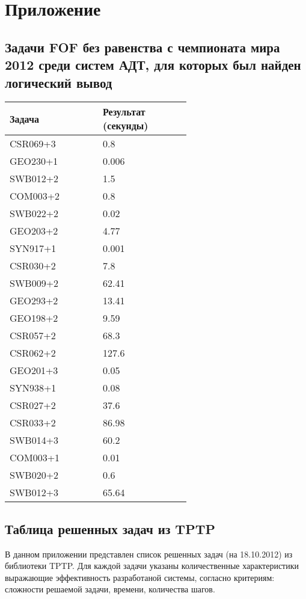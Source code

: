\chapter*{Приложение}




\section*{Задачи FOF без равенства с чемпионата мира 2012 среди систем АДТ, для которых был найден логический вывод}

\begin{longtable}[H]{|p{0.3\linewidth}|p{0.3\linewidth}|}
\hline
\textbf{Задача} & \textbf{Результат (секунды)} \\
\hline
CSR069+3 & 0.8  \\
\hline
GEO230+1 & 0.006  \\
\hline
SWB012+2 & 1.5  \\
\hline
COM003+2 & 0.8 \\
\hline
SWB022+2 & 0.02 \\
\hline
GEO203+2 & 4.77 \\
\hline
SYN917+1 & 0.001 \\
\hline
CSR030+2 & 7.8 \\
\hline
SWB009+2 & 62.41 \\
\hline
GEO293+2 & 13.41 \\
\hline
GEO198+2 & 9.59 \\
\hline
CSR057+2 & 68.3 \\
\hline
CSR062+2 & 127.6 \\
\hline
GEO201+3 & 0.05 \\
\hline
SYN938+1 & 0.08 \\
\hline
CSR027+2 & 37.6 \\
\hline
CSR033+2 & 86.98 \\
\hline
SWB014+3 & 60.2 \\
\hline
COM003+1 & 0.01 \\
\hline
SWB020+2 & 0.6 \\
\hline
SWB012+3 & 65.64 \\
\hline
\end{longtable}

\section*{Таблица решенных задач из TPTP}
В данном приложении представлен список решенных задач (на 18.10.2012) из библиотеки TPTP. Для каждой задачи указаны количественные характеристики выражающие эффективность разработаной системы, согласно критериям: сложности решаемой задачи, времени, количества шагов.

